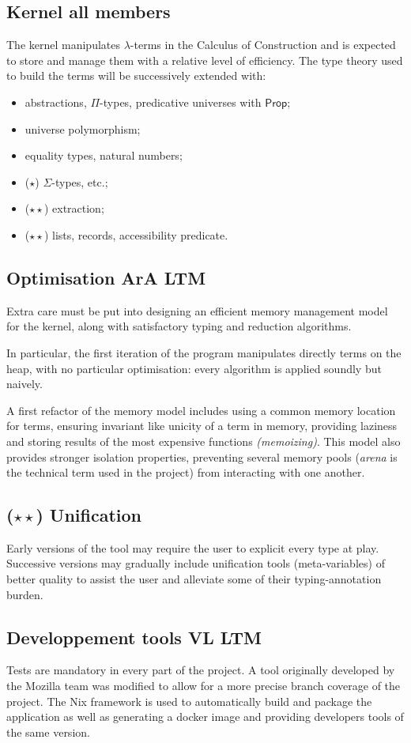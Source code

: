 \documentclass[twocolumn]{article}
\newcommand{\members}[1]{\texorpdfstring{\hfill\scriptsize #1}{}}
\newcommand{\etun}{{\color{Green} ($\star$)} }
\newcommand{\etde}{{\color{Orange} ($\star\star$)} }
\begin{document}
\subsection{Kernel \members{all members}}
The kernel manipulates
\(\lambda\)-terms in the Calculus of Construction and is expected to store and
manage them with a relative level of efficiency. The type theory used to build
the terms will be successively extended with:
\begin{itemize}
	\item abstractions, \(\Pi\)-types, predicative universes with \(\mathsf{Prop}\);
	\item universe polymorphism;
	\item equality types, natural numbers;
	\item \etun \(\Sigma\)-types, etc.;
	\item \etde extraction;
	\item \etde lists, records, accessibility predicate.
\end{itemize}


\subsection{Optimisation \members{ArA LTM}}
Extra care must be put into designing an efficient memory management model for
the kernel, along with satisfactory typing and reduction algorithms.

In particular, the first iteration of the program manipulates directly terms on
the heap, with no particular optimisation: every algorithm is applied soundly
but naively.

A first refactor of the memory model includes using a common memory location for
terms, ensuring invariant like unicity of a term in memory, providing laziness
and storing results of the most expensive functions \emph{(memoizing)}. This
model also provides stronger isolation properties, preventing several memory
pools (\emph{arena} is the technical term used in the project) from interacting
with one another.

\subsection{\etde Unification}\label{sec:unification}
Early versions of the tool may require the user to explicit every type at play.
Successive versions may gradually include unification tools (meta-variables) of
better quality to assist the user and alleviate some of their typing-annotation
burden.

\subsection{Developpement tools \members{VL LTM}}
Tests are mandatory in every part of the project. A tool originally developed by
the Mozilla team was modified to allow for a more precise branch coverage of the
project. The Nix framework is used to automatically build and package the
application as well as generating a docker image and providing developers tools
of the same version.

\end{document}
